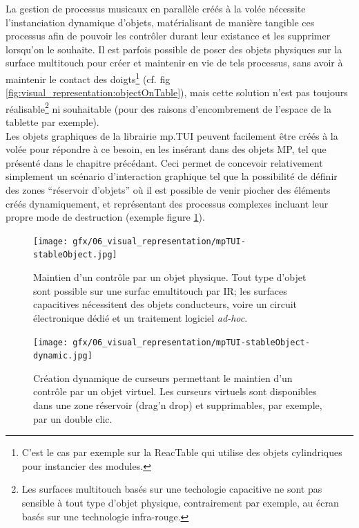 \noindent La gestion de processus musicaux en parallèle créés à la volée nécessite l'instanciation dynamique d'objets, matérialisant de manière tangible ces processus afin de pouvoir les contrôler durant leur existance et les supprimer lorsqu'on le souhaite. Il est parfois possible de poser des objets physiques sur la surface multitouch pour créer et maintenir en vie de tels processus, sans avoir à maintenir le contact des doigts\footnote{C'est le cas par exemple sur la ReacTable qui utilise des objets cylindriques pour instancier des modules.} (cf. fig \ref{fig:visual_representation:objectOnTable}), mais cette solution n'est pas toujours réalisable\footnote{Les surfaces multitouch basés sur une techologie capacitive ne sont pas sensible à tout type d'objet physique, contrairement par exemple, au écran basés sur une technologie infra-rouge.} ni souhaitable (pour des raisons d'encombrement de l'espace de la tablette par exemple).\\
\indent Les objets graphiques de la librairie mp.TUI peuvent facilement être créés à la volée pour répondre à ce besoin, en les insérant dans des objets MP, tel que présenté dans le chapitre précédant. Ceci permet de concevoir relativement simplement un scénario d'interaction graphique tel que la possibilité de définir des zones ``réservoir d'objets'' où il est possible de venir piocher des éléments créés dynamiquement, et représentant des processus complexes incluant leur propre mode de destruction (exemple figure \ref{fig:visual_representation:dynamicInstanciation}).
\begin{figure}[!htbp]
	\captionsetup{format=plain}%
	\centering
	\begin{minipage}[t]{0.48\textwidth}
		\texttt{[image: gfx/06\_visual\_representation/mpTUI-stableObject.jpg]}
		\caption[Maintien d'un contrôle par un objet physique]{Maintien d'un contrôle par un objet physique. Tout type d'objet sont possible sur une surfac emultitouch par IR; les surfaces capacitives nécessitent des objets conducteurs, voire un circuit électronique dédié et un traitement logiciel \textit{ad-hoc}.}
		\label{fig:visual_representation:objectOnTable}
	\end{minipage}
	\hspace{.02\linewidth}
	\begin{minipage}[t]{0.48\textwidth}
	    \texttt{[image: gfx/06\_visual\_representation/mpTUI-stableObject-dynamic.jpg]}
		\caption[Maintien d'un contrôle par un objet virtuel]{Création dynamique de curseurs permettant le maintien d'un contrôle par un objet virtuel. Les curseurs virtuels sont disponibles dans une zone réservoir (drag'n drop) et supprimables, par exemple, par un double clic.}
		\label{fig:visual_representation:dynamicInstanciation}
	\end{minipage}
\end{figure}

